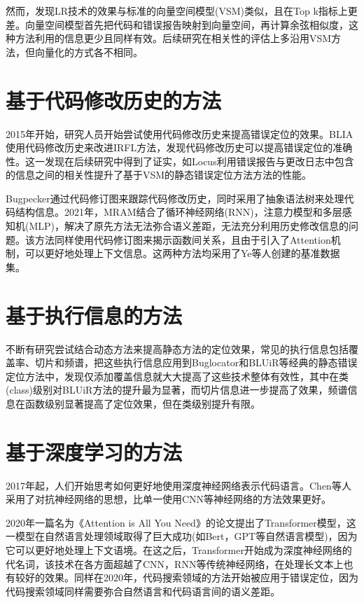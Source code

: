 然而，\cite{7272945}发现LR技术的效果与标准的向量空间模型(VSM)类似，且在Top k指标上更差。向量空间模型首先把代码和错误报告映射到向量空间，再计算余弦相似度，这种方法利用的信息更少且同样有效。后续研究在相关性的评估上多沿用VSM方法，但向量化的方式各不相同。
\section{基于代码修改历史的方法}
2015年开始，研究人员开始尝试使用代码修改历史来提高错误定位的效果。BLIA\cite{7467300}使用代码修改历史来改进IRFL方法，发现代码修改历史可以提高错误定位的准确性。这一发现在后续研究中得到了证实，如Locus\cite{7582764}利用错误报告与更改日志中包含的信息之间的相关性提升了基于VSM的静态错误定位方法方法的性能。

Bugpecker\cite{9286037}通过代码修订图来跟踪代码修改历史，同时采用了抽象语法树来处理代码结构信息。2021年，MRAM\cite{9462960}结合了循环神经网络(RNN)，注意力模型和多层感知机(MLP)，解决了原先方法无法弥合语义差距，无法充分利用历史修改信息的问题。该方法同样使用代码修订图来揭示函数间关系，且由于引入了Attention机制，可以更好地处理上下文信息。这两种方法均采用了Ye等人创建的基准数据集。
\section{基于执行信息的方法}
不断有研究尝试结合动态方法来提高静态方法的定位效果，常见的执行信息包括覆盖率、切片和频谱，\cite{7961521}把这些执行信息应用到Buglocator和BLUiR等经典的静态错误定位方法中，发现仅添加覆盖信息就大大提高了这些技术整体有效性，其中在类(class)级别对BLUiR方法的提升最为显著，而切片信息进一步提高了效果，频谱信息在函数级别显著提高了定位效果，但在类级别提升有限。
\section{基于深度学习的方法}
2017年起，人们开始思考如何更好地使用深度神经网络表示代码语言\cite{10.1145/3106237.3106290}。Chen\cite{10062428}等人采用了对抗神经网络的思想，比单一使用CNN等神经网络的方法效果更好。

2020年一篇名为《Attention is All You Need》\cite{NIPS2017_3f5ee243}的论文提出了Transformer模型，这一模型在自然语言处理领域取得了巨大成功(如Bert，GPT等自然语言模型)，因为它可以更好地处理上下文语境。在这之后，Transformer开始成为深度神经网络的代名词，该技术在各方面超越了CNN，RNN等传统神经网络，在处理长文本上也有较好的效果。同样在2020年，代码搜索领域的方法开始被应用于错误定位\cite{9462960}\cite{Liang2022}，因为代码搜索领域同样需要弥合自然语言和代码语言间的语义差距。

